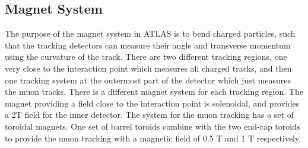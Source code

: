 \subsection{Magnet System}

The purpose of the magnet system in ATLAS is to bend charged particles, such that the tracking detectors can measure their angle and transverse momentum using the curvature of the track. 
There are two different tracking regions, one very close to the interaction point which measures all charged tracks, and then one tracking system at the outermost part of the detector which just measures the muon tracks. 
There is a different magnet system for each tracking region.
The magnet providing a field close to the interaction point is solenoidal, and provides a 2T field for the inner detector. 
The system for the muon tracking has a set of toroidal magnets.
One set of barrel toroids combine with the two end-cap toroids to provide the muon tracking with a magnetic field of 0.5 T and 1 T respectively.

